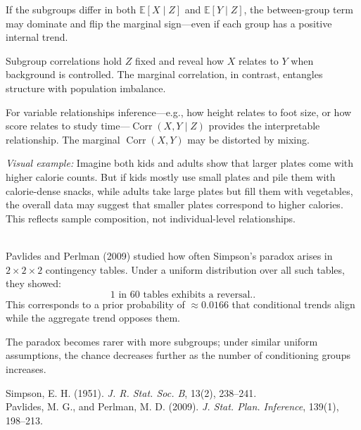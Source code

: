 \begin{technical}
If the subgroups differ in both \( \mathbb{E}[X \mid Z] \) and \( \mathbb{E}[Y \mid Z] \), the between-group term may dominate and flip the marginal sign—even if each group has a positive internal trend.

Subgroup correlations hold \( Z \) fixed and reveal how \( X \) relates to \( Y \) when background is controlled. The marginal correlation, in contrast, entangles structure with population imbalance.

For variable relationships inference—e.g., how height relates to foot size, or how score relates to study time—\( \operatorname{Corr}(X, Y \mid Z) \) provides the interpretable relationship. The marginal \( \operatorname{Corr}(X, Y) \) may be distorted by mixing.

\vspace{0.5em}
\noindent\textit{Visual example:} Imagine both kids and adults show that larger plates come with higher calorie counts. But if kids mostly use small plates and pile them with calorie-dense snacks, while adults take large plates but fill them with vegetables, the overall data may suggest that smaller plates correspond to higher calories. This reflects sample composition, not individual-level relationships.

\vspace{1em}
\\[0.5em]
Pavlides and Perlman (2009) studied how often Simpson’s paradox arises in \( 2 \times 2 \times 2 \) contingency tables. Under a uniform distribution over all such tables, they showed:
\[
\boxed{\text{1 in 60 tables exhibits a reversal.}}.
\]
This corresponds to a prior probability of \( \approx 0.0166 \) that conditional trends align while the aggregate trend opposes them.

The paradox becomes rarer with more subgroups; under similar uniform assumptions, the chance decreases further as the number of conditioning groups increases.

\techref
{\footnotesize
Simpson, E. H. (1951). \textit{J. R. Stat. Soc. B}, 13(2), 238–241.\\
Pavlides, M. G., and Perlman, M. D. (2009). \textit{J. Stat. Plan. Inference}, 139(1), 198–213.
}
\end{technical}
